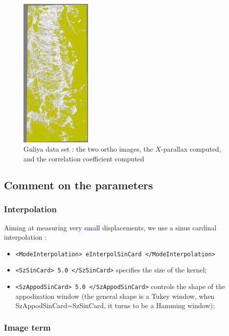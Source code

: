 \begin{figure}
\begin{center}
\includegraphics[width=35mm]{FIGS/SeismGuylia/Correl.jpg} %

\end{center}
\caption{Guliya data set : the two ortho images, the $X$-parallax computed, and the correlation
coefficient computed}
\label{FIG:OK:Guylia}
\end{figure}




\subsection{Comment on the parameters}


\subsubsection{Interpolation}

Aiming at measuring very \textcolor{blue}{small} displacements, we use a sinus cardinal interpolation :

\begin{itemize}
   \item {\tt <ModeInterpolation> eInterpolSinCard </ModeInterpolation>}

   \item  {\tt <SzSinCard>  5.0 </SzSinCard>} specifies the size of the kernel;

   \item  {\tt  <SzAppodSinCard>  5.0 </SzAppodSinCard>} controls the shape of the appodization
          window (the general shape is a Tukey window, when SzAppodSinCard=SzSinCard, it turns to be
          a Hamming window);
\end{itemize}


\subsubsection{Image term}

